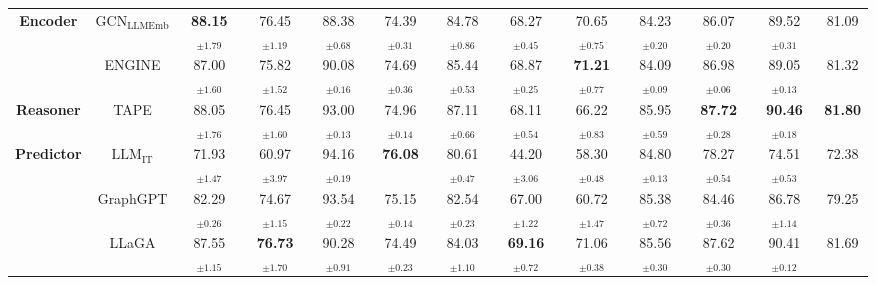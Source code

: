 \begin{table*}[!t]
{\begin{tabular}{cc|ccccccccccc}
      \multirow{2}{*}{\textbf{Encoder}} & $\text{GCN}_{\text{LLMEmb}}$ & 
      \cellcolor{orange!25} \textbf{88.15$_{\pm \text{1.79}}$} & \cellcolor{orange!10} 76.45$_{\pm \text{1.19}}$ & 88.38$_{\pm \text{0.68}}$ & 74.39$_{\pm \text{0.31}}$ & 84.78$_{\pm \text{0.86}}$ & 68.27$_{\pm \text{0.45}}$ & 70.65$_{\pm \text{0.75}}$ & 84.23$_{\pm \text{0.20}}$ & 86.07$_{\pm \text{0.20}}$ & 89.52$_{\pm \text{0.31}}$ & 81.09 \\ 
      & ENGINE & 87.00$_{\pm \text{1.60}}$ & 75.82$_{\pm \text{1.52}}$ & 90.08$_{\pm \text{0.16}}$ & 74.69$_{\pm \text{0.36}}$ & 85.44$_{\pm \text{0.53}}$ & \cellcolor{orange!10} 68.87$_{\pm \text{0.25}}$ & \cellcolor{orange!25} \textbf{71.21$_{\pm \text{0.77}}$} & 84.09$_{\pm \text{0.09}}$ & 86.98$_{\pm \text{0.06}}$ & 89.05$_{\pm \text{0.13}}$ & 81.32 \\  \midrule
      \textbf{Reasoner} & TAPE &  \cellcolor{orange!10} 88.05$_{\pm \text{1.76}}$ & 76.45$_{\pm \text{1.60}}$ & 93.00$_{\pm \text{0.13}}$ & 74.96$_{\pm \text{0.14}}$ & \cellcolor{orange!10} 87.11$_{\pm \text{0.66}}$ & 68.11$_{\pm \text{0.54}}$ & 66.22$_{\pm \text{0.83}}$ &  85.95$_{\pm \text{0.59}}$ & \cellcolor{orange!25} \textbf{87.72$_{\pm \text{0.28}}$} & \cellcolor{orange!25} \textbf{90.46$_{\pm \text{0.18}}$} & \cellcolor{orange!25}\textbf{81.80} \\  \midrule
      \multirow{3}{*}{\textbf{Predictor}} & $\text{LLM}_{\text{IT}}$ & 71.93$_{\pm \text{1.47}}$ & 60.97$_{\pm \text{3.97}}$ &  94.16$_{\pm \text{0.19}}$ & \cellcolor{orange!25} \textbf{76.08} & 80.61$_{\pm \text{0.47}}$ & 44.20$_{\pm \text{3.06}}$ & 58.30$_{\pm \text{0.48}}$ & 84.80$_{\pm \text{0.13}}$ & 78.27$_{\pm \text{0.54}}$ & 74.51$_{\pm \text{0.53}}$ & 72.38 \\ 
      & GraphGPT & 82.29$_{\pm \text{0.26}}$ & 74.67$_{\pm \text{1.15}}$ & 93.54$_{\pm \text{0.22}}$ & \cellcolor{orange!10} 75.15$_{\pm \text{0.14}}$ & 82.54$_{\pm \text{0.23}}$ & 67.00$_{\pm \text{1.22}}$  & 60.72$_{\pm \text{1.47}}$ & 85.38$_{\pm \text{0.72}}$ & 84.46$_{\pm \text{0.36}}$ & 86.78$_{\pm \text{1.14}}$ & 79.25  \\ 
      & LLaGA & 87.55$_{\pm \text{1.15}}$ & \cellcolor{orange!25} \textbf{76.73$_{\pm \text{1.70}}$} & 90.28$_{\pm \text{0.91}}$ & 74.49$_{\pm \text{0.23}}$ & 84.03$_{\pm \text{1.10}}$ & \cellcolor{orange!25} \textbf{69.16$_{\pm \text{0.72}}$} & \cellcolor{orange!10} 71.06$_{\pm \text{0.38}}$ & 85.56$_{\pm \text{0.30}}$ & \cellcolor{orange!10} 87.62$_{\pm \text{0.30}}$ & \cellcolor{orange!10} 90.41$_{\pm \text{0.12}}$ & \cellcolor{orange!10}81.69 \\ \bottomrule
    \end{tabular}
    }

    \label{tab:mainexp}
\end{table*}